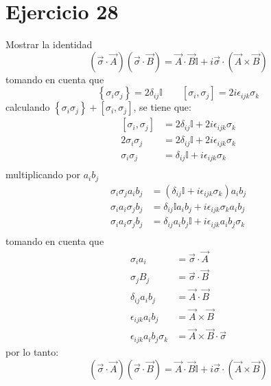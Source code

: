 \section*{Ejercicio 28}
Mostrar la identidad 
\begin{equation*}
    \left(\vec{\sigma}\cdot \vec{A}\right)\left(\vec{\sigma}\cdot\vec{B}\right) = \vec{A}\cdot \vec{B} \mathbb{I} + i 
    \vec{\sigma} \cdot \left(\vec{A}\times \vec{B}\right)
\end{equation*}
tomando en cuenta que
\begin{equation*}
    \left\lbrace \sigma_i \sigma_j \right\rbrace= 2 \delta_{ij}\mathbb{I} \qquad
    \left[\sigma_i,\sigma_j\right] = 2i \epsilon_{ijk} \sigma_k
\end{equation*}
calculando $\left\lbrace \sigma_i \sigma_j \right\rbrace +\left[\sigma_i,\sigma_j\right]$, se tiene que:
\begin{align*}
    \left[\sigma_i,\sigma_j\right]  &= 2 \delta_{ij}\mathbb{I}  +  2i \epsilon_{ijk} \sigma_k \\
    2 \sigma_i \sigma_j &=  2 \delta_{ij}\mathbb{I}  +  2i \epsilon_{ijk} \sigma_k \\
 \sigma_i \sigma_j &=  \delta_{ij}\mathbb{I}  +  i \epsilon_{ijk} \sigma_k \\
\end{align*}
multiplicando por $a_ib_j$
\begin{align*}
    \sigma_i \sigma_j a_ib_j& =  \left(\delta_{ij}\mathbb{I}  +  i \epsilon_{ijk} \sigma_k\right) a_i b_j\\
    \sigma_i a_i\sigma_j b_j& =  \delta_{ij}\mathbb{I} a_ib_j +  i \epsilon_{ijk} \sigma_k a_i b_j\\
    \sigma_i a_i\sigma_j b_j& =  \delta_{ij}a_ib_j\mathbb{I}  +  i \epsilon_{ijk}a_i b_j \sigma_k\\
\end{align*}
tomando en cuenta que 
\begin{align*}
    \sigma_i a_i &=\vec{\sigma}\cdot \vec{A}\\
    \sigma_j B_j &=\vec{\sigma}\cdot \vec{B}\\
    \delta_{ij}a_ib_j &= \vec{A}\cdot \vec{B} \\
    \epsilon_{ijk}a_i b_j &= \vec{A}\times \vec{B} \\ 
    \epsilon_{ijk}a_i b_j \sigma_k & =\vec{A}\times \vec{B} \cdot \vec{\sigma}
\end{align*}
por lo tanto:
\begin{equation*}
    \left(\vec{\sigma}\cdot \vec{A}\right)\left(\vec{\sigma}\cdot\vec{B}\right) = \vec{A}\cdot \vec{B} \mathbb{I} + i 
    \vec{\sigma} \cdot \left(\vec{A}\times \vec{B}\right)
\end{equation*}